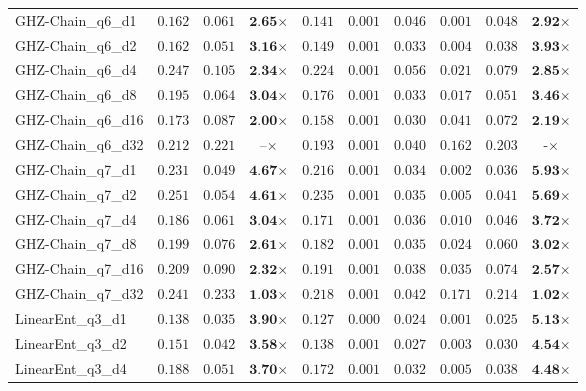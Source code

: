 \begin{table*}[t]
{\begin{tabular}{| l || r r c || r r r r r c |}
GHZ-Chain\_q6\_d1 & $0.162$ & $0.061$ & $\textbf{2.65}$$\times$ & $0.141$ & $0.001$ & $0.046$ & $0.001$ & $0.048$ & $\textbf{2.92}$$\times$ \\
GHZ-Chain\_q6\_d2 & $0.162$ & $0.051$ & $\textbf{3.16}$$\times$ & $0.149$ & $0.001$ & $0.033$ & $0.004$ & $0.038$ & $\textbf{3.93}$$\times$ \\
GHZ-Chain\_q6\_d4 & $0.247$ & $0.105$ & $\textbf{2.34}$$\times$ & $0.224$ & $0.001$ & $0.056$ & $0.021$ & $0.079$ & $\textbf{2.85}$$\times$ \\
GHZ-Chain\_q6\_d8 & $0.195$ & $0.064$ & $\textbf{3.04}$$\times$ & $0.176$ & $0.001$ & $0.033$ & $0.017$ & $0.051$ & $\textbf{3.46}$$\times$ \\
GHZ-Chain\_q6\_d16 & $0.173$ & $0.087$ & $\textbf{2.00}$$\times$ & $0.158$ & $0.001$ & $0.030$ & $0.041$ & $0.072$ & $\textbf{2.19}$$\times$ \\
GHZ-Chain\_q6\_d32 & $0.212$ & $0.221$ & $\textbf{--}$$\times$ & $0.193$ & $0.001$ & $0.040$ & $0.162$ & $0.203$ & $\textbf{-}$$\times$ \\
GHZ-Chain\_q7\_d1 & $0.231$ & $0.049$ & $\textbf{4.67}$$\times$ & $0.216$ & $0.001$ & $0.034$ & $0.002$ & $0.036$ & $\textbf{5.93}$$\times$ \\
GHZ-Chain\_q7\_d2 & $0.251$ & $0.054$ & $\textbf{4.61}$$\times$ & $0.235$ & $0.001$ & $0.035$ & $0.005$ & $0.041$ & $\textbf{5.69}$$\times$ \\
GHZ-Chain\_q7\_d4 & $0.186$ & $0.061$ & $\textbf{3.04}$$\times$ & $0.171$ & $0.001$ & $0.036$ & $0.010$ & $0.046$ & $\textbf{3.72}$$\times$ \\
GHZ-Chain\_q7\_d8 & $0.199$ & $0.076$ & $\textbf{2.61}$$\times$ & $0.182$ & $0.001$ & $0.035$ & $0.024$ & $0.060$ & $\textbf{3.02}$$\times$ \\
GHZ-Chain\_q7\_d16 & $0.209$ & $0.090$ & $\textbf{2.32}$$\times$ & $0.191$ & $0.001$ & $0.038$ & $0.035$ & $0.074$ & $\textbf{2.57}$$\times$ \\
GHZ-Chain\_q7\_d32 & $0.241$ & $0.233$ & $\textbf{1.03}$$\times$ & $0.218$ & $0.001$ & $0.042$ & $0.171$ & $0.214$ & $\textbf{1.02}$$\times$ \\
LinearEnt\_q3\_d1 & $0.138$ & $0.035$ & $\textbf{3.90}$$\times$ & $0.127$ & $0.000$ & $0.024$ & $0.001$ & $0.025$ & $\textbf{5.13}$$\times$ \\
LinearEnt\_q3\_d2 & $0.151$ & $0.042$ & $\textbf{3.58}$$\times$ & $0.138$ & $0.001$ & $0.027$ & $0.003$ & $0.030$ & $\textbf{4.54}$$\times$ \\
LinearEnt\_q3\_d4 & $0.188$ & $0.051$ & $\textbf{3.70}$$\times$ & $0.172$ & $0.001$ & $0.032$ & $0.005$ & $0.038$ & $\textbf{4.48}$$\times$ \\

\end{tabular}}
\end{table*}
